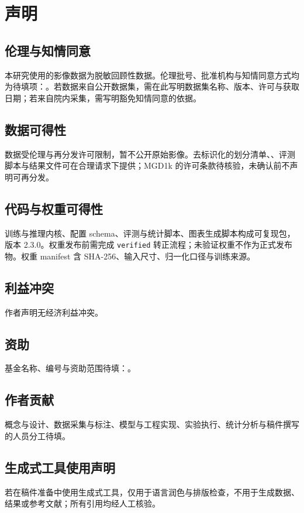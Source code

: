 \section*{声明}

\subsection*{伦理与知情同意}
本研究使用的影像数据为脱敏回顾性数据。伦理批号、批准机构与知情同意方式均为待填项：。若数据来自公开数据集，需在此写明数据集名称、版本、许可与获取日期；若来自院内采集，需写明豁免知情同意的依据。

\subsection*{数据可得性}
数据受伦理与再分发许可限制，暂不公开原始影像。去标识化的划分清单、、评测脚本与结果文件可在合理请求下提供；MGD1k 的许可条款待核验，未确认前不声明可再分发。

\subsection*{代码与权重可得性}
训练与推理内核、配置 schema、评测与统计脚本、图表生成脚本构成可复现包，版本 2.3.0。权重发布前需完成 \texttt{verified} 转正流程；未验证权重不作为正式发布物。权重 manifest 含 SHA-256、输入尺寸、归一化口径与训练来源。

\subsection*{利益冲突}
作者声明无经济利益冲突。

\subsection*{资助}
基金名称、编号与资助范围待填：。

\subsection*{作者贡献}
概念与设计、数据采集与标注、模型与工程实现、实验执行、统计分析与稿件撰写的人员分工待填。

\subsection*{生成式工具使用声明}
若在稿件准备中使用生成式工具，仅用于语言润色与排版检查，不用于生成数据、结果或参考文献；所有引用均经人工核验。
